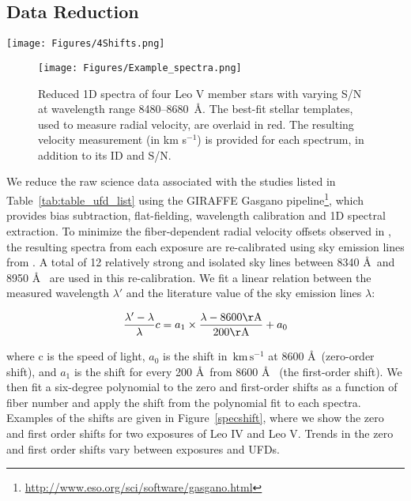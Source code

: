 \documentclass[twocolumn]{aastex63}
\newcommand{\unit}[1]{\ensuremath{\mathrm{\,#1}}\xspace}
\newcommand{\kms}{\unit{km\,s^{-1}}}
\newcommand{\revise}[1]{#1}
\begin{document}
\subsection{Data Reduction}
\label{sec:reduction}
\begin{figure*}
\centering
\texttt{[image: Figures/4Shifts.png]}
\caption{Examples of the shifts in wavelength recalibration using sky emission lines as a function of fiber ID for each GIRAFFE exposure. The green and blue curves represent sixth degree polynomial fits to the zero and first-order shifts, respectively. We apply the shift corresponding to the polynomial fit to each spectra. Top: Two observations of Leo IV. Bottom: Two observations of Leo V. \label{specshift}}
\end{figure*}
\begin{figure}
\centering
\texttt{[image: Figures/Example\_spectra.png]}
\caption{Reduced 1D spectra of four Leo V member stars with varying S/N at wavelength range 8480--8680~\AA. The best-fit stellar templates, used to measure radial velocity, are overlaid in red. The resulting velocity measurement (in km s$^{-1}$) is provided for each spectrum, in addition to its ID and S/N. \label{examplespectra}}
\end{figure}
We reduce the raw science data associated with the studies listed in Table~\ref{tab:table_ufd_list} using the GIRAFFE Gasgano pipeline\footnote{\url{http://www.eso.org/sci/software/gasgano.html}}, which provides bias subtraction, flat-fielding, wavelength calibration and 1D spectral extraction. To minimize the fiber-dependent radial velocity offsets observed in \citet{kop2011}, the resulting spectra from each exposure are re-calibrated using sky emission lines from \citet{han2003}. \revise{A total of 12 relatively strong and isolated sky lines between 8340 \AA~and 8950 \AA~ are used in this re-calibration. We fit a linear relation between the measured wavelength $\lambda'$ and the literature value of the sky emission lines $\lambda$:}
\revise{
\begin{equation}
\frac{\lambda'-\lambda}{\lambda}c = a_1 \times \frac{\lambda-8600\mathrm{\AA}}{200\mathrm{\AA}} + a_0
\end{equation}
}

\noindent\revise{where c is the speed of light, $a_0$ is the shift in \kms at 8600 \AA~(zero-order shift), and $a_1$ is the shift for every 200 \AA~from 8600 \AA~ (the first-order shift).}
We then fit a six-degree polynomial to the zero and first-order shifts as a function of fiber number and apply the shift from the polynomial fit to each spectra. Examples of the shifts are given in Figure~\ref{specshift}, where we show the zero and first order shifts for two exposures of Leo IV and Leo V. Trends in the zero and first order shifts vary between exposures and UFDs. 
\end{document}
